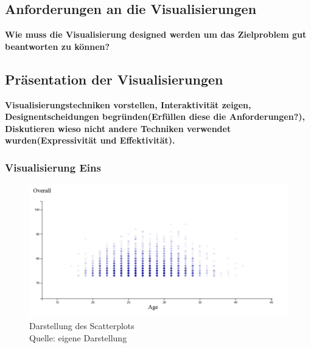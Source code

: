 \documentclass[usegeometry=true]{scrartcl}
\begin{document}
\subsection{Anforderungen an die Visualisierungen}
\textbf{Wie muss die Visualisierung designed werden um das Zielproblem gut beantworten zu können?}
\subsection{Präsentation der Visualisierungen}


\textbf{Visualisierungstechniken vorstellen, Interaktivität zeigen, Designentscheidungen begründen(Erfüllen diese die Anforderungen?), Diskutieren wieso nicht andere Techniken verwendet wurden(Expressivität und Effektivität).}
\subsubsection{Visualisierung Eins}

\begin{figure}[h]
\centering
\includegraphics[scale=0.4]{grafiken/Scatterplot1}
\caption{Darstellung des Scatterplots\\ Quelle: eigene Darstellung}
\end{figure}
\end{document}
